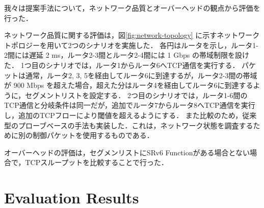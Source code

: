 \documentclass[conference]{IEEEtran}
\begin{document}

我々は提案手法について，ネットワーク品質とオーバーヘッドの観点から評価を行った．

ネットワーク品質に関する評価は，図\ref{fig:network-topology} に示すネットワークトポロジーを用いて2つのシナリオを実施した．
各円はルータを示し，ルータ1-2間には遅延 2 ms，ルータ2-3間とルータ2-4間には 1 Gbps の帯域制限を設けた．
1つ目のシナリオでは，ルータ1からルータ6へTCP通信を実行する．
パケットは通常，ルータ2, 3, 5を経由してルータ6に到達するが，ルータ2-3間の帯域が 900 Mbps を超えた場合，超えた分はルータ4を経由してルータ6に到達するように，セグメントリストを設定する．
2つ目のシナリオでは，ルータ1-6間のTCP通信と分岐条件は同一だが，追加でルータ7からルータ8へTCP通信を実行し，追加のTCPフローにより閾値を超えるようにする．
また比較のため，従来型のプローブベースの手法も実装した．これは，ネットワーク状態を調査するために別の制御パケットを使用するものである．

オーバーヘッドの評価は，セグメンリストにSRv6 Functionがある場合とない場合で，TCPスループットを比較することで行った．

\section{Evaluation Results}

\end{document}
